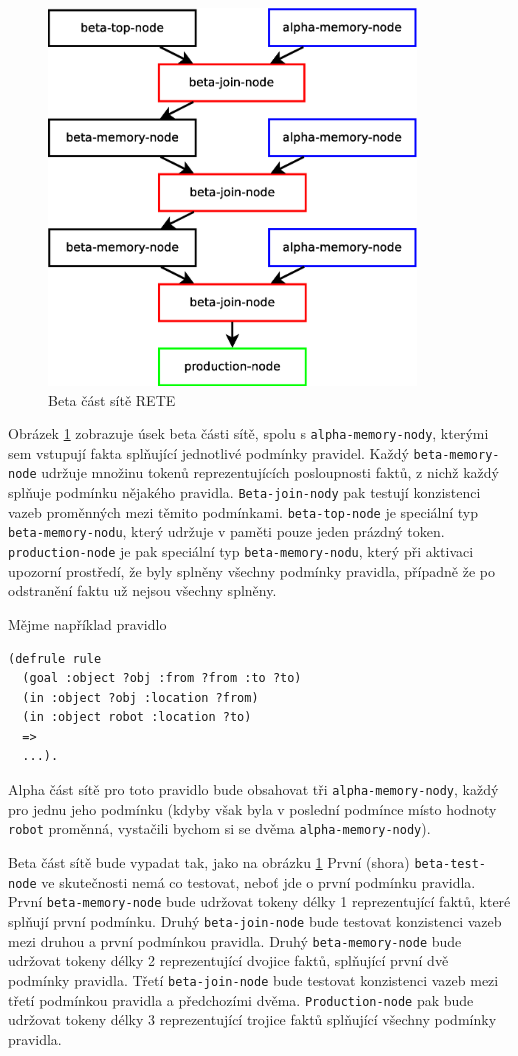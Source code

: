 \begin{figure}[h]
\centering
\includegraphics[height=10cm]{rete-beta.eps}
\caption{Beta část sítě RETE}
\label{rete-beta}
\end{figure}

Obrázek \ref{rete-beta} zobrazuje úsek beta části sítě, spolu s
\verb|alpha-memory-nody|, kterými sem vstupují fakta splňující jednotlivé
podmínky pravidel. Každý \verb|beta-memory-node| udržuje množinu tokenů
reprezentujících posloupnosti faktů, z nichž každý splňuje podmínku nějakého
pravidla. \verb|Beta-join-nody| pak testují konzistenci vazeb proměnných mezi
těmito podmínkami. \verb|beta-top-node| je speciální typ
\verb|beta-memory-nodu|, který udržuje v paměti pouze jeden prázdný token.
\verb|production-node| je pak speciální typ \verb|beta-memory-nodu|, který
při aktivaci upozorní prostředí, že byly splněny všechny podmínky pravidla,
případně že po odstranění faktu už nejsou všechny splněny.

Mějme například pravidlo
\begin{verbatim}
(defrule rule
  (goal :object ?obj :from ?from :to ?to)
  (in :object ?obj :location ?from)
  (in :object robot :location ?to)
  =>
  ...).
\end{verbatim}
Alpha část sítě pro toto pravidlo bude obsahovat tři \verb|alpha-memory-nody|,
každý pro jednu jeho podmínku (kdyby však byla v poslední podmínce místo hodnoty
\verb|robot| proměnná, vystačili bychom si se dvěma \verb|alpha-memory-nody|).

Beta část sítě bude vypadat tak, jako na obrázku \ref{rete-beta} První (shora)
\verb|beta-test-node| ve skutečnosti nemá co testovat, neboť jde o první
podmínku pravidla. První \verb|beta-memory-node| bude udržovat tokeny délky 1
reprezentující  faktů, které splňují první podmínku. Druhý
\verb|beta-join-node| bude testovat konzistenci vazeb mezi druhou a první
podmínkou pravidla. Druhý \verb|beta-memory-node| bude udržovat tokeny délky 2
reprezentující dvojice faktů, splňující první dvě podmínky pravidla. Třetí
\verb|beta-join-node| bude testovat konzistenci vazeb mezi třetí podmínkou
pravidla a předchozími dvěma. \verb|Production-node| pak bude udržovat tokeny
délky 3 reprezentující trojice faktů splňující všechny podmínky pravidla.

